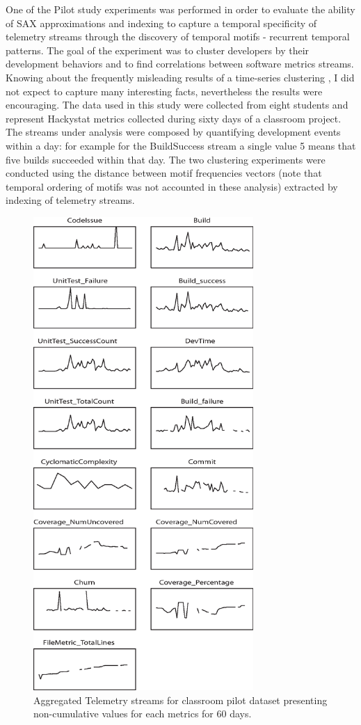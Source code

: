 \documentclass{sig-alternate}
\begin{document}
One of the Pilot study experiments was performed in order to evaluate the ability of SAX approximations and indexing to capture a temporal specificity of telemetry streams through the discovery of temporal motifs - recurrent temporal patterns. The goal of the experiment was to cluster developers by their development behaviors and to find correlations between software metrics streams. Knowing about the frequently misleading results of a time-series clustering \cite{citeulike:227029}, I did not expect to capture many interesting facts, nevertheless the results were encouraging. The data used in this study were collected from eight students and represent Hackystat metrics collected during sixty days of a classroom project. The streams under analysis were composed by quantifying development events within a day: for example for the BuildSuccess stream a single value 5 means that five builds succeeded within that day. The two clustering experiments were conducted using the distance between motif frequencies vectors (note that temporal ordering of motifs was not accounted in these analysis) extracted by indexing of telemetry streams.

\begin{figure}[tp]
   \centering
   \includegraphics[height=180mm]{telemetry_streams.eps}
   \caption{Aggregated Telemetry streams for classroom pilot dataset presenting non-cumulative values for each metrics for 60 days.}
   \label{fig:streams}
\end{figure}
\end{document}
